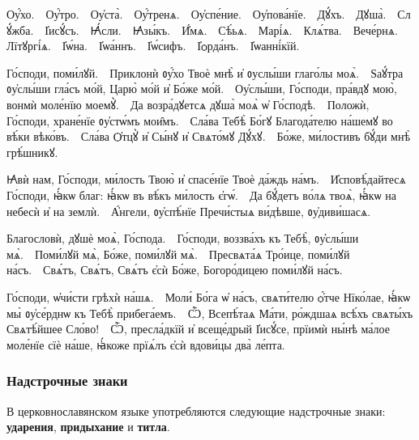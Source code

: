 \documentclass[11pt,a4paper,oneside]{memoir}
\begin{document}
    \begin{slv}
        Оу҆́хо.~\textemdash~Оу҆́тро.~\textemdash~Оу҆ста̀.~\textemdash~Оу҆́тренѧ.~\textemdash~Оу҆спе́ние.~\textemdash~Оу҆пова́нїе.~\textemdash~Дꙋ́хъ.~\textemdash~Дꙋша̀.~\textemdash~Слꙋ́жба.~\textemdash~І҆исꙋ́съ.~\textemdash~Ꙗ҆́сли.~\textemdash~Ꙗ҆зы́къ.~\textemdash~И҆́мѧ.~\textemdash~Сѣ́ьѧ.~\textemdash~Марі́ѧ.~\textemdash~Клѧ́тва.~\textemdash~Вече́рнѧ.~\textemdash~Лїтꙋргі́ѧ.~\textemdash~І҆ѡ́на.~\textemdash~І҆ѡа́ннъ.~\textemdash~І҆ѡ́сифъ.~\textemdash~І҆ѻрда́нъ.~\textemdash~І҆ѡанні́кїй.
        
        Го́споди, поми́лꙋй.~\textemdash~Приклонѝ ᲂу҆́хо Твоѐ мнѣ̀ и҆ ᲂуслы́ши глаго́лы моѧ̀.~\textemdash~Ѕаꙋ́тра ᲂу҆слы́ши гла́съ мо́й, Царю̀ мо́й и҆ Бо́же мо́й.~\textemdash~Оу҆слы́ши, Го́споди, пра́вдꙋ мою̀, вонмѝ моле́нїю моемꙋ̀.~\textemdash~Да возра́дꙋетсѧ дꙋша̀ моѧ̀ ѡ҆ Го́сподѣ.~\textemdash~Положѝ, Го́споди, хране́нїе ᲂу҆стѡ́мъ мои̑мъ.~\textemdash~Сла́ва Тебѣ̀ Бо́гꙋ Благода́телю на́шемꙋ во вѣ́ки вѣко́въ.~\textemdash~Сла́ва Ѻ҆тцꙋ̀ и҆ Сы́нꙋ и҆ Свѧто́мꙋ Дꙋ́хꙋ.~\textemdash~Бо́же, ми́лостивъ бꙋ́ди мнѣ̀ грѣ́шникꙋ.
        
        Ꙗ҆вѝ нам, Го́споди, ми́лость Твою̀ и҆ спасе́нїе Твоѐ да́ждь на́мъ.~\textemdash~И҆сповѣ́дайтесѧ Го́споди, ꙗ҆́кѡ благ: ꙗ҆́кѡ въ вѣ́къ ми́лость є҆гѡ́.~\textemdash~Да бꙋ́детъ во́лѧ твоѧ̀, ꙗ҆́кѡ на небесѝ и҆ на землѝ.~\textemdash~А҆́нгели, ᲂу҆спѣ́нїе Пречи́стыѧ ви́дѣвше, ᲂу҆диви́шасѧ.
        
        Благословѝ, дꙋшѐ моѧ̀, Го́спода.~\textemdash~Го́споди, воззва́хъ къ Тебѣ̀, ᲂу҆слы́ши мѧ̀.~\textemdash~Поми́лꙋй мѧ̀, Бо́же, поми́лꙋй мѧ̀.~\textemdash~Пресвѧта́ѧ Тро́ице, поми́лꙋй на́съ.~\textemdash~Свѧ́тъ, Свѧ́тъ, Свѧ́тъ є҆сѝ Бо́же, Богоро́дицею поми́лꙋй на́съ.
        
        Го́споди, ѡ҆чи́сти грѣхѝ на́шѧ.~\textemdash~Моли́ Бо́га ѡ҆ на́съ, свѧти́телю ѻ҆́тче Нїко́лае, ꙗ҆́кѡ мы̀ ᲂу҆се́рднѡ къ Тебѣ̀ прибега́емъ.~\textemdash~Ѽ, Всепѣ́таѧ Ма́ти, ро́ждшаѧ всѣ́хъ свѧты́хъ Свѧтѣ́йшее Сло́во!~\textemdash~Ѽ, пресла́дкїй и҆ всеще́дрый І҆исꙋ́се, прїимѝ ны́нѣ ма́лое моле́нїе сїѐ на́ше, ꙗ҆́коже прїѧ́лъ є҆сѝ вдови́цы два̀ ле́пта.
    \end{slv}

                \subsubsection{Надстрочные знаки}

    В церковнославянском языке употребляются следующие надстрочные знаки: \textbf{ударения}, \textbf{придыхание} и \textbf{титла}.
    \medskip
    
\end{document}
